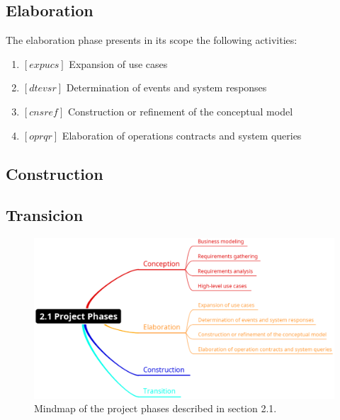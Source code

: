 \documentclass[11pt, twoside, a4paper]{book}
\begin{document}
				\subsection{Elaboration}
				
					The elaboration phase presents in its scope the following activities:
					
					\begin{enumerate}
						\item $[expucs]$ Expansion of use cases								
						\item $[dtevsr]$ Determination of events and system responses
						\item $[cnsref]$ Construction or refinement of the conceptual model
						\item $[oprqr]$ Elaboration of operations contracts and system queries
					\end{enumerate}
					
				\subsection{Construction}
										
				\subsection{Transicion}

				\begin{figure}[!ht]
					\centering
  					\includegraphics[scale=0.4]{2-1_Project_Phases.eps}
					\caption{Mindmap of the project phases described in section 2.1.}
				\end{figure}
\end{document}
